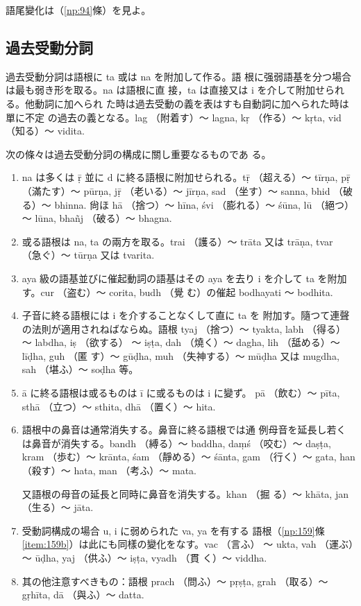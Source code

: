 語尾變化は（\ref{np:94}條）を見よ。

\subsection{過去受動分詞}
\numberParagraph
過去受動分詞は語根に ta 或は na を附加して作る。語
根に强弱語基を分つ場合は最も弱き形を取る。na は語根に直
接，ta は直接又は i を介して附加せられる。他動詞に加へられ
た時は過去受動の義を表はすも自動詞に加へられた時は單に不定
の過去の義となる。lag （附着す）～ lagna, kṛ （作る）～ kṛta, vid
（知る）～ vidita.

\numberParagraph \label{np:179}
次の條々は過去受動分詞の構成に關し重要なるものであ
る。
\begin{enumerate}[label=(\alph*)]
\item na は多くは ṝ 並に d に終る語根に附加せられる。tṝ
（超える）～ tīrṇa, pṝ （滿たす）～ pūrṇa, jṝ （老いる）～
jīrṇa, sad （坐す）～ sanna, bhid （破る）～ bhinna. 尙ほ
hā （捨つ）～ hīna, śvi （膨れる）～ śūna, lū （絕つ）～ lūna,
bhañj （破る）～ bhagna.
\item 或る語根は na, ta の兩方を取る。trai （護る）～ trāta
又は trāṇa, tvar （急ぐ）～ tūrṇa 又は tvarita.
\item aya 級の語基並びに催起動詞の語基はその aya を去り
i を介して ta を附加す。cur （盗む）～ corita, budh （覺
む）の催起 bodhayati ～ bodhita.
\item 子音に終る語根には i を介することなくして直に ta を
附加す。隨つて連聲の法則が適用されねばならぬ。語根
tyaj （捨つ）～ tyakta, labh （得る）～ labdha, iṣ （欲する）
～ iṣṭa, dah （燒く）～ dagha, lih （䑛める）～ līḍha, guh （匿
す）～ gūḍha, muh （失神する）～ mūḍha 又は mugdha, sah
（堪ふ）～ soḍha 等。
\item ā に終る語根は或るものは ī に或るものは i に變ず。
pā （飲む）～ pīta, sthā （立つ）～ sthita, dhā （置く）～ hita.
\item 語根中の鼻音は通常消失する。鼻音に終る語根では通
例母音を延長し若くは鼻音が消失する。bandh （縛る）～
baddha, daṃś （咬む）～ daṣṭa, kram （歩む）～ krānta, śam
（靜める）～ śānta, gam （行く）～ gata, han （殺す）～ hata,
man （考ふ）～ mata.

又語根の母音の延長と同時に鼻音を消失する。khan （掘
る）～ khāta, jan （生る）～ jāta.
\item 受動詞構成の場合 u, i に弱められた va, ya を有する
語根（\ref{np:159}條 \ref{item:159b}）は此にも同樣の變化をなす。vac （言ふ）
～ ukta, vah （運ぶ）～ ūḍha, yaj （供ふ）～ iṣṭa, vyadh （貫
く）～ viddha.
\item 其の他注意すべきもの：語根 prach （問ふ）～ pṛṣṭa,
grah （取る）～ gṛhīta, dā （與ふ）～ datta.
\end{enumerate}

